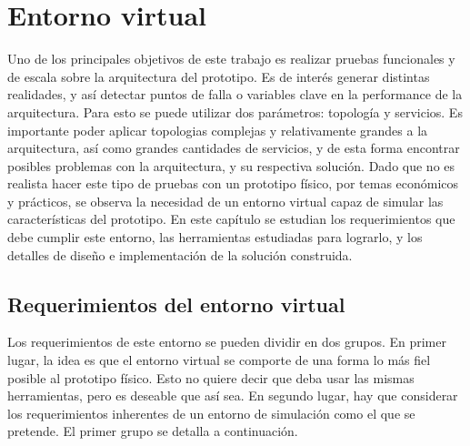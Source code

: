 \chapter{Entorno virtual}

\graphicspath{{Chapter3/Figs/}}

Uno de los principales objetivos de este trabajo es realizar pruebas funcionales y de escala sobre la arquitectura del prototipo. Es de interés generar distintas realidades, y así detectar puntos de falla o variables clave en la performance de la arquitectura. Para esto se puede utilizar dos parámetros: topología y servicios. Es importante poder aplicar topologias complejas y relativamente grandes a la arquitectura, así como grandes cantidades de servicios, y de esta forma encontrar posibles problemas con la arquitectura, y su respectiva solución. Dado que no es realista hacer este tipo de pruebas con un prototipo físico, por temas económicos y prácticos, se observa la necesidad de un entorno virtual capaz de simular las características del prototipo. En este capítulo se estudian los requerimientos que debe cumplir este entorno, las herramientas estudiadas para lograrlo, y los detalles de diseño e implementación de la solución construida.

\section{Requerimientos del entorno virtual}
Los requerimientos de este entorno se pueden dividir en dos grupos. En primer lugar, la idea es que el entorno virtual se comporte de una forma lo más fiel posible al prototipo físico. Esto no quiere decir que deba usar las mismas herramientas, pero es deseable que así sea. En segundo lugar, hay que considerar los requerimientos inherentes de un entorno de simulación como el que se pretende. El primer grupo se detalla a continuación.

